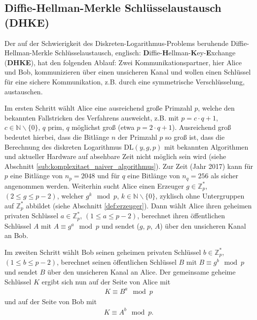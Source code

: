 \documentclass[
  a4paper,
  11pt,
]{scrartcl}
\theoremstyle{plain}
\theoremstyle{definition}
\theoremstyle{remark}
\newcommand{\N}{\mathbb{N}}
\newcommand{\Z}{\mathbb{Z}}
\begin{document}
\subsection{Diffie-Hellman-Merkle Schlüsselaustausch (DHKE)}
\label{sub:diffie_hellman_key_exchange}

Der auf der Schwierigkeit des Diskreten-Logarithmus-Problems beruhende Diffie-Hellman-Merkle Schlüsselaustausch, englisch: \textbf{D}iffie-\textbf{H}ellman-\textbf{K}ey-\textbf{E}xchange (\textbf{DHKE}), hat den folgenden Ablauf:
Zwei Kommunikationspartner, hier Alice und Bob, kommunizieren über einen unsicheren Kanal und wollen einen Schlüssel für eine sichere Kommunikation, z.B. durch eine symmetrische Verschlüsselung, austauschen.

Im ersten Schritt wählt Alice eine ausreichend große Primzahl $p$, welche den bekannten Fallstricken des Verfahrens ausweicht, z.B. mit $p = c \cdot q+1$, $c \in \N\backslash\{0\}$, $q$ prim, $q$ möglichst groß (etwa $p = 2 \cdot q + 1$). Ausreichend groß bedeutet hierbei, dass die Bitlänge $n$ der Primzahl $p$ so groß ist, dass die Berechnung des diskreten Logarithmus $\text{DL}(y,g,p)$ mit bekannten Algorithmen und aktueller Hardware auf absehbare Zeit nicht möglich sein wird (siehe Abschnitt \ref{sub:komplexitaet_naiver_algorithmus}). Zur Zeit (Jahr 2017) kann für $p$ eine Bitlänge von $n_p = 2048$ und für $q$ eine Bitlänge von $n_q = 256$ als sicher angenommen werden. Weiterhin sucht Alice einen Erzeuger $g \in \Z_p^*$, $(2 \leq g \leq p-2)$, welcher $g^k \mod p$, $k \in \N \backslash \{0\}$, zyklisch ohne Untergruppen auf $\Z_p^*$ abbildet (siehe Abschnitt \ref{def:erzeuger}). Dann wählt Alice ihren geheimen privaten Schlüssel $a \in \Z_p^*$, $(1 \leq a \leq p-2)$,  berechnet ihren öffentlichen Schlüssel $A$ mit $A \equiv g^a \mod p$ und sendet ($g$, $p$, $A$) über den unsicheren Kanal an Bob.

Im zweiten Schritt wählt Bob seinen geheimen privaten Schlüssel $b \in \Z_p^*$, $(1 \leq b \leq p-2)$, berechnet seinen öffentlichen Schlüssel $B$ mit $B \equiv g^b \mod p$ und sendet $B$ über den unsicheren Kanal an Alice.
Der gemeinsame geheime Schlüssel $K$ ergibt sich nun auf der Seite von Alice mit
\begin{align*}
	K \equiv B^a \mod p
\end{align*}
und auf der Seite von Bob mit
\begin{align*}
	K \equiv A^b \mod p \text{.}
\end{align*}
\end{document}
